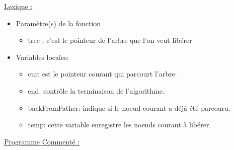 \documentclass[a4paper]{article}
\begin{document}
\underline{Lexique :}
\begin{itemize}
\item Paramètre(s) de la fonction  
\begin{itemize}
\item tree : c'est le pointeur de l'arbre que l'on veut libérer
\end{itemize}
\item Variables locales:
\begin{itemize}
\item cur: est le pointeur courant qui parcourt l'arbre.
\item end: contrôle la terminaison de l'algorithme.
\item backFromFather: indique si le noeud courant a déjà été parcouru.
\item temp: cette variable enregistre les noeuds courant à libérer.
\end{itemize}
\end{itemize}
\underline{Programme Commenté :}


\newpage
\end{document}
